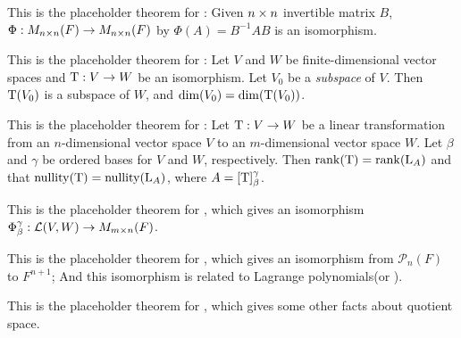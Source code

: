 \begin{additional theorem} \label{athm 2.40}
This is the placeholder theorem for :
Given \(n \times n\) invertible matrix \(B\),
\(\Phi : M_{n \times n}(F) \to M_{n \times n}(F)\) by \(\Phi(A) = B^{-1}AB\) is an isomorphism.
\end{additional theorem}

\begin{additional theorem} \label{athm 2.41}
This is the placeholder theorem for :
Let \(V\) and \(W\) be finite-dimensional vector spaces and \(\mathrm{T} : V \to W\) be an isomorphism.
Let \(V_0\) be a \emph{subspace} of \(V\).
Then \(\mathrm{T}(V_0)\) is a subspace of \(W\), and \(\dim(V_0) = \dim(\mathrm{T}(V_0))\).
\end{additional theorem}

\begin{additional theorem} \label{athm 2.42}
This is the placeholder theorem for :
Let \(\mathrm{T}: V \to W\) be a linear transformation from an \(n\)-dimensional vector space \(V\) to an \(m\)-dimensional vector space \(W\).
Let \(\beta\) and \(\gamma\) be ordered bases for \(V\) and \(W\), respectively.
Then \(\mathrm{rank}(\mathrm{T}) = \mathrm{rank}(\mathrm{L}_A)\) and that \(\mathrm{nullity}(\mathrm{T}) = \mathrm{nullity}(\mathrm{L}_A)\), where \(A = [\mathrm{T}]_{\beta}^{\gamma}\).
\end{additional theorem}

\begin{additional theorem} \label{athm 2.43}
This is the placeholder theorem for , which gives an isomorphism \(\Phi_{\beta}^{\gamma} : \mathcal{L}(V, W) \to M_{m \times n}(F)\).
\end{additional theorem}

\begin{additional theorem} \label{athm 2.44}
This is the placeholder theorem for , which gives an isomorphism from \(\mathcal{P}_n(F)\) to \(F^{n + 1}\);
And this isomorphism is related to Lagrange polynomials(or ).
\end{additional theorem}

\begin{additional theorem} \label{athm 2.45}
This is the placeholder theorem for , which gives some other facts about quotient space.
\end{additional theorem}